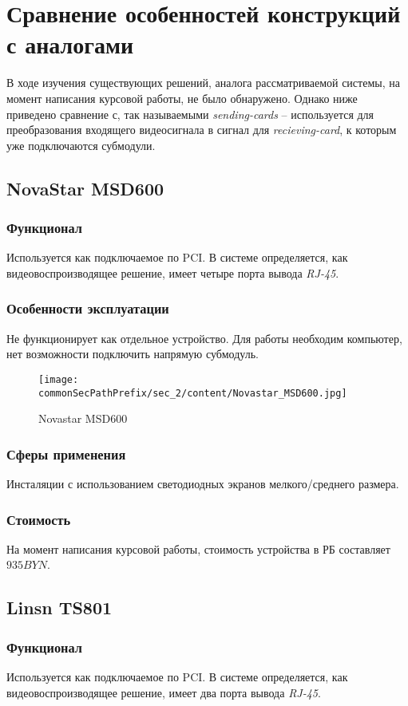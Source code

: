 \section{Сравнение особенностей конструкций с аналогами}
\label{sec:analogs}
В ходе изучения существующих решений, аналога рассматриваемой системы, на момент написания курсовой работы, не было обнаружено. Однако ниже приведено сравнение с, так называемыми \textit{sending-cards} -- используется для преобразования входящего видеосигнала в сигнал для \textit{recieving-card}, к которым уже подключаются субмодули.

\subsection{NovaStar MSD600}
\subsubsection{Функционал}
Используется как подключаемое по PCI. В системе определяется, как видеовоспроизводящее решение, имеет четыре порта вывода \textit{RJ-45}. 
\subsubsection{Особенности эксплуатации}
Не функционирует как отдельное устройство. Для работы необходим компьютер, нет возможности подключить напрямую субмодуль.
\begin{figure}[ht]
    \centering
    \texttt{[image: \\commonSecPathPrefix/sec\_2/content/Novastar\_MSD600.jpg]}
    \caption{Novastar MSD600}
\end{figure}
\subsubsection{Сферы применения}
Инсталяции с использованием светодиодных экранов мелкого/среднего размера.
\subsubsection{Стоимость}
На момент написания курсовой работы, стоимость устройства в РБ составляет \(935BYN\).

\subsection{Linsn TS801}
\subsubsection{Функционал}
Используется как подключаемое по PCI. В системе определяется, как видеовоспроизводящее решение, имеет два порта вывода \textit{RJ-45}. 
